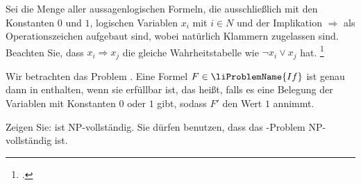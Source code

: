 \documentclass{bschlangaul-aufgabe}
\begin{document}

Sei  die Menge aller aussagenlogischen Formeln, die
ausschließlich mit den Konstanten $0$ und $1$, logischen Variablen $x_i$
mit $i \in N$ und der Implikation $\Rightarrow$ als Operationszeichen
aufgebaut sind, wobei natürlich Klammern zugelassen sind. Beachten Sie,
dass $x_i \Rightarrow x_j$ die gleiche Wahrheitstabelle wie $\neg x_i
\lor x_j$ hat.
\footcite{examen:66115:2020:09}

Wir betrachten das Problem . Eine Formel $F \in
\liProblemName{If}$ ist genau dann in  enthalten,
wenn sie erfüllbar ist, das heißt, falls es eine Belegung der Variablen
mit Konstanten $0$ oder $1$ gibt, sodass $F'$ den Wert $1$ annimmt.

Zeigen Sie:  ist NP-vollständig. Sie dürfen
benutzen, dass das -Problem NP-vollständig ist.

\begin{liAntwort}

\end{liAntwort}
\end{document}
